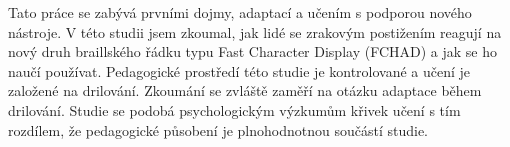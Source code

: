 Tato práce se zabývá prvními dojmy, adaptací a učením s podporou nového nástroje. V této studii jsem zkoumal, jak lidé se zrakovým postižením reagují na nový druh braillského řádku typu Fast Character Display (FCHAD) a jak se ho naučí používat. Pedagogické prostředí této studie je kontrolované a učení je založené na drilování. Zkoumání se zvláště zaměří na otázku adaptace během drilování. Studie se podobá psychologickým výzkumům křivek učení s tím rozdílem, že pedagogické působení je plnohodnotnou součástí studie.
